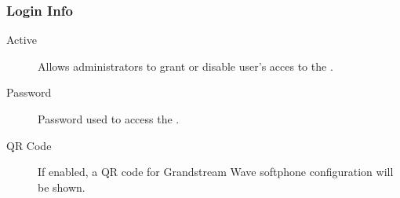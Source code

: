 \documentclass[letterpaper,10pt,english]{sphinxmanual}
\begin{document}
\subsubsection{Login Info}
\label{administration_portal/client/vpbx/users:login-info}\begin{description}
\item[{Active}] \leavevmode{}\label{administration_portal/client/vpbx/users:term-active}
Allows administrators to grant or disable user's acces to the
{\hyperref[user_portal/index:userportal]{}}.

\item[{Password}] \leavevmode{}\label{administration_portal/client/vpbx/users:term-password}
Password used to access the {\hyperref[user_portal/index:userportal]{}}.

\item[{QR Code}] \leavevmode{}\label{administration_portal/client/vpbx/users:term-qr-code}
If enabled, a QR code for Grandstream Wave softphone configuration
will be shown.

\end{description}
\end{document}
